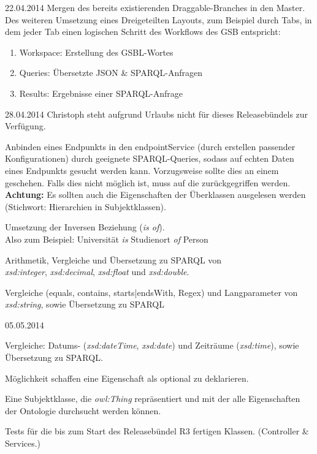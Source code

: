 \begin{release}{22.04.2014}
%
Mergen des bereits existierenden Draggable-Branches in den Master. Des weiteren Umsetzung eines Dreigeteilten Layouts, zum Beispiel durch Tabs, in dem jeder Tab einen logischen Schritt des Workflows des GSB entspricht:
\begin{enumerate}
\item Workspace: Erstellung des GSBL-Wortes
\item Queries: Übersetzte JSON \& SPARQL-Anfragen
\item Results: Ergebnisse einer SPARQL-Anfrage
\end{enumerate}
\end{release}


\begin{release}{28.04.2014}
Christoph steht aufgrund Urlaubs nicht für dieses Releasebündels zur Verfügung.

%
Anbinden eines Endpunkts in den endpointService (durch erstellen passender Konfigurationen) durch geeignete SPARQL-Queries, sodass auf echten Daten eines Endpunkts gesucht werden kann. Vorzugsweise sollte dies an einem   geschehen. Falls dies nicht möglich ist, muss auf die  zurückgegriffen werden.\\
\textbf{Achtung:} Es sollten auch die Eigenschaften der Überklassen ausgelesen werden (Stichwort: Hierarchien in Subjektklassen).

%
Umsetzung der Inversen Beziehung (\textit{is of}).\\
Also zum Beispiel: \glqq Universität \textit{is} Studienort \textit{of} Person\grqq

%
Arithmetik, Vergleiche und Übersetzung zu SPARQL von\\
\textit{xsd:integer}, \textit{xsd:decimal}, \textit{xsd:float} und \textit{xsd:double}.

%
Vergleiche (equals, contains, starts|endsWith,  Regex) und Langparameter von \textit{xsd:string}, sowie Übersetzung zu SPARQL
\end{release}


\begin{release}{05.05.2014}

%
Vergleiche: Datums- (\textit{xsd:dateTime}, \textit{xsd:date}) und Zeiträume (\textit{xsd:time}), sowie Übersetzung zu SPARQL.

%
Möglichkeit schaffen eine Eigenschaft als optional zu deklarieren.

%
Eine Subjektklasse, die \textit{owl:Thing} repräsentiert und mit der alle Eigenschaften der Ontologie durchsucht werden können.

%
Tests für die bis zum Start des Releasebündel R3 fertigen Klassen. (Controller \& Services.)
\end{release}


